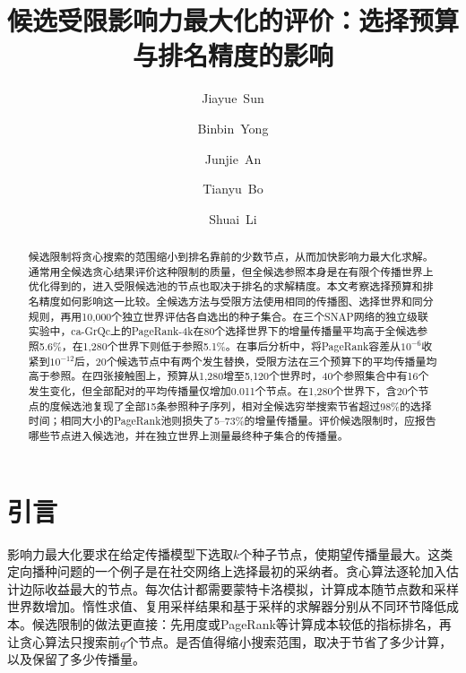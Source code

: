 \documentclass[smallextended]{svjour3}
\begin{document}
\def\abstractname{摘要}\def\keywordname{\textbf{关键词}}\def\figurename{图}\def\tablename{表}\def\refname{参考文献}
\title{候选受限影响力最大化的评价：选择预算与排名精度的影响}
\author{\mbox{Jiayue Sun} \and \mbox{Binbin Yong} \and \mbox{Junjie An} \and \mbox{Tianyu Bo} \and \mbox{Shuai Li}}
\date{}
\maketitle

\begin{abstract}
候选限制将贪心搜索的范围缩小到排名靠前的少数节点，从而加快影响力最大化求解。通常用全候选贪心结果评价这种限制的质量，但全候选参照本身是在有限个传播世界上优化得到的，进入受限候选池的节点也取决于排名的求解精度。本文考察选择预算和排名精度如何影响这一比较。全候选方法与受限方法使用相同的传播图、选择世界和同分规则，再用10,000个独立世界评估各自选出的种子集合。在三个SNAP网络的独立级联实验中，ca-GrQc上的PageRank-4k在80个选择世界下的增量传播量平均高于全候选参照5.6\%，在1,280个世界下则低于参照5.1\%。在事后分析中，将PageRank容差从$10^{-6}$收紧到$10^{-12}$后，20个候选节点中有两个发生替换，受限方法在三个预算下的平均传播量均高于参照。在四张接触图上，预算从1,280增至5,120个世界时，40个参照集合中有16个发生变化，但全部配对的平均传播量仅增加0.011个节点。在1,280个世界下，含20个节点的度候选池复现了全部15条参照种子序列，相对全候选穷举搜索节省超过98\%的选择时间；相同大小的PageRank池则损失了5--73\%的增量传播量。评价候选限制时，应报告哪些节点进入候选池，并在独立世界上测量最终种子集合的传播量。
\end{abstract}

\section{引言}
影响力最大化要求在给定传播模型下选取$k$个种子节点，使期望传播量最大\cite{ref1}。这类定向播种问题的一个例子是在社交网络上选择最初的采纳者。贪心算法逐轮加入估计边际收益最大的节点。每次估计都需要蒙特卡洛模拟，计算成本随节点数和采样世界数增加。惰性求值、复用采样结果和基于采样的求解器分别从不同环节降低成本\cite{ref7,ref8,ref2}。候选限制的做法更直接：先用度或PageRank等计算成本较低的指标排名，再让贪心算法只搜索前$q$个节点。是否值得缩小搜索范围，取决于节省了多少计算，以及保留了多少传播量。
\end{document}
